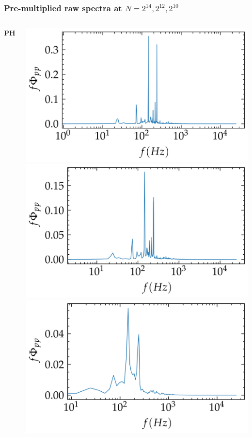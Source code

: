 \documentclass[aspectratio=169,10pt]{beamer}
\begin{document}
\begin{frame}
    \frametitle{Pre-multiplied raw spectra at $N=2^{14}, 2^{12}, 2^{10}$}
    \begin{columns}[c] %
            \centering
            \textbf{PH}
            \par\medskip
            \includegraphics[width=0.5\linewidth]{../figures/cali_09/flow/raw/Pyy_ph_atm_npsg32768.png}
            \includegraphics[width=0.5\linewidth]{../figures/cali_09/flow/raw/Pyy_ph_atm_npsg16384.png}
            \includegraphics[width=0.5\linewidth]{../figures/cali_09/flow/raw/Pyy_ph_atm_npsg4096.png}


\end{columns}
\end{frame}
\end{document}

